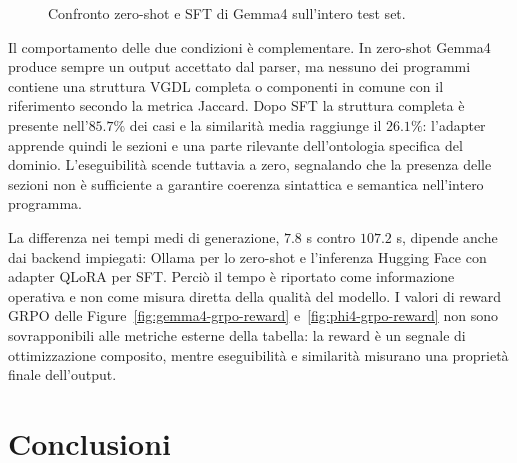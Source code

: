 \documentclass[final,5p,times,twocolumn]{elsarticle}
\begin{document}
\begin{figure}[t]
  \centering
  \caption{Confronto zero-shot e SFT di Gemma4 sull'intero test set.}
  \label{fig:gemma4-test-comparison}
\end{figure}

Il comportamento delle due condizioni è complementare. In zero-shot Gemma4 produce sempre un output accettato dal parser, ma nessuno dei programmi contiene una struttura VGDL completa o componenti in comune con il riferimento secondo la metrica Jaccard. Dopo SFT la struttura completa è presente nell'$85.7\%$ dei casi e la similarità media raggiunge il $26.1\%$: l'adapter apprende quindi le sezioni e una parte rilevante dell'ontologia specifica del dominio. L'eseguibilità scende tuttavia a zero, segnalando che la presenza delle sezioni non è sufficiente a garantire coerenza sintattica e semantica nell'intero programma.

La differenza nei tempi medi di generazione, $7.8$ s contro $107.2$ s, dipende anche dai backend impiegati: Ollama per lo zero-shot e l'inferenza Hugging Face con adapter QLoRA per SFT. Perciò il tempo è riportato come informazione operativa e non come misura diretta della qualità del modello. I valori di reward GRPO delle Figure~\ref{fig:gemma4-grpo-reward} e~\ref{fig:phi4-grpo-reward} non sono sovrapponibili alle metriche esterne della tabella: la reward è un segnale di ottimizzazione composito, mentre eseguibilità e similarità misurano una proprietà finale dell'output.

\section{Conclusioni}
\end{document}
